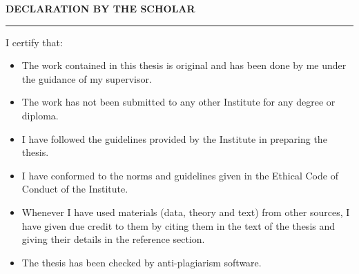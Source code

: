 
\baselineskip
\centerline{\textbf{DECLARATION BY THE SCHOLAR}}
\noindent\rule{16cm}{1pt}
\baselineskip


\noindent
I certify that:

\begin{itemize}
	\item The work contained in this thesis is original and has been done by me under the guidance of my supervisor.
	\item  The work has not been submitted to any other Institute for any degree or diploma.
	\item I have followed the guidelines provided by the Institute in preparing the thesis.
	\item I have conformed to the norms and guidelines given in the Ethical Code of Conduct of the Institute.
	\item Whenever I have used materials (data, theory and text) from other sources, I have given due credit to them by citing them in the text of the thesis and giving their details in the reference section.
	\item The thesis has been checked by anti-plagiarism software.
\end{itemize}


\vspace*{2.5cm}
\begin{flushright}
\authorname
\end{flushright}
